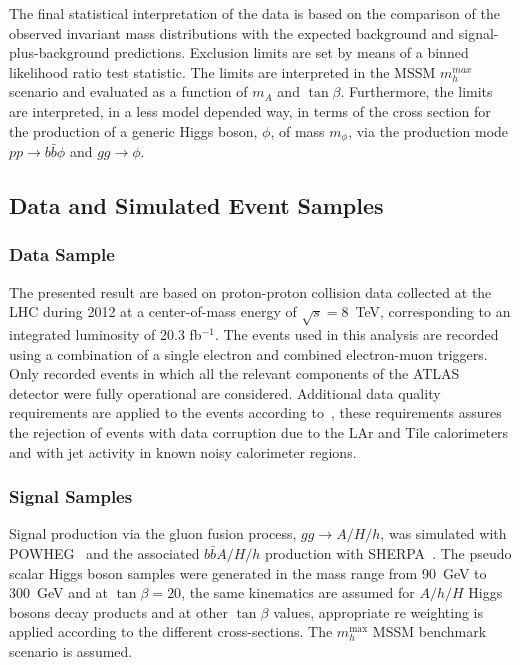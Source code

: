 The final statistical interpretation of the data is based on the 
comparison of the observed invariant mass distributions with the expected background and signal-plus-background
predictions. Exclusion limits are set by means of a binned likelihood ratio
test statistic. The limits are interpreted  in the MSSM $m_{h}^{max}$ scenario and evaluated as a function
of $m_A$ and $\tan\beta$. Furthermore, the limits are interpreted, in a less model depended
way, in terms of the cross section for the production of a generic Higgs boson, $\phi$, of mass  $m_\phi$, 
via the production mode $pp \rightarrow b\bar{b}\phi$ and $gg \rightarrow \phi$.


 




\subsection{Data and Simulated Event Samples}
\label{sec:sample}
\subsubsection{Data Sample}

The  presented result  are based on proton-proton collision data
collected at the LHC during 2012 at a center-of-mass energy of $\sqrt{s}=8$~TeV,
corresponding to an integrated luminosity of 20.3 fb$^{-1}$.
The events used in this analysis are recorded using a combination of a
single electron and combined electron-muon triggers. Only recorded events 
in which all the relevant components of the ATLAS detector were
fully operational are considered.
Additional data quality requirements are applied to the events according to~\cite{ATLASCLEANING},
these requirements assures the rejection of  events with data corruption due to the LAr and Tile calorimeters and
with jet activity in known noisy calorimeter regions. 




\subsubsection{Signal Samples}
Signal production via the gluon fusion process, $gg\rightarrow A/H/h$,
was simulated with POWHEG~\cite{POWHEG} and the associated
$b\bar{b}A/H/h$ production with SHERPA~\cite{SHERPA}.  The
pseudo scalar Higgs boson samples were generated in the mass range from
90~GeV to 300~GeV and at $\tan\beta = 20$, the same kinematics
are assumed for $A/h/H$ Higgs bosons decay products and at other
$\tan\beta$ values, appropriate re weighting is applied according to the
different cross-sections. The $m_h^{\mathrm{max}}$ MSSM benchmark
scenario is assumed.


